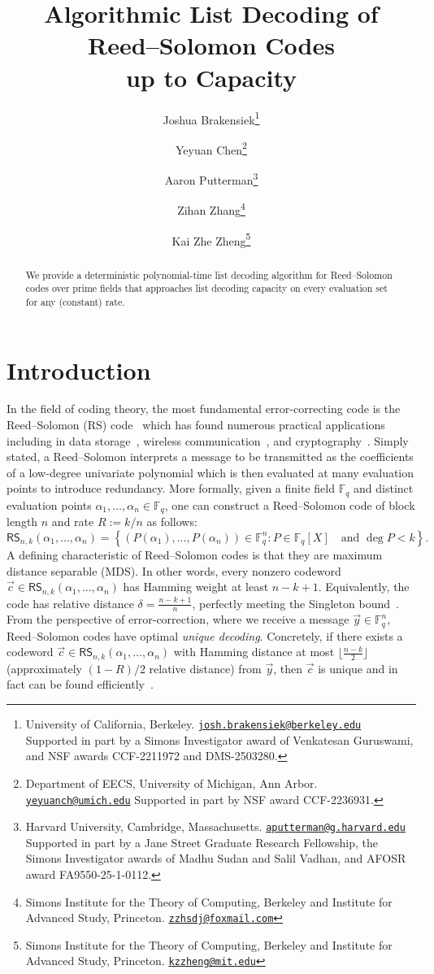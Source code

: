 \documentclass[11pt]{article}
\title{\textbf{Algorithmic List Decoding of Reed--Solomon Codes\\
up to Capacity}}
\author{
Joshua Brakensiek\thanks{
University of California, Berkeley.
\href{mailto:josh.brakensiek@berkeley.edu}{\texttt{josh.brakensiek@berkeley.edu}}
Supported in part by a Simons Investigator award of Venkatesan Guruswami, and NSF awards CCF-2211972 and DMS-2503280.
}
\and
Yeyuan Chen\thanks{
Department of EECS, University of Michigan, Ann Arbor.
\href{mailto:yeyuanch@umich.edu}{\texttt{yeyuanch@umich.edu}}
Supported in part by NSF award CCF-2236931.
}
\and
Aaron Putterman\thanks{
Harvard University, Cambridge, Massachusetts.
\href{mailto:aputterman@g.harvard.edu}{\texttt{aputterman@g.harvard.edu}}
Supported in part by a Jane Street Graduate Research Fellowship, the Simons Investigator awards of Madhu Sudan and Salil Vadhan, and AFOSR award FA9550-25-1-0112.
}
\and
Zihan Zhang\thanks{
Simons Institute for the Theory of Computing, Berkeley and
Institute for Advanced Study, Princeton.
\href{mailto:zzhsdj@foxmail.com}{\texttt{zzhsdj@foxmail.com}}
}
\and
Kai Zhe Zheng\thanks{
Simons Institute for the Theory of Computing, Berkeley and
Institute for Advanced Study, Princeton.
\href{mailto:kzzheng@mit.edu}{\texttt{kzzheng@mit.edu}}
}
}
\date{}
\newcommand{\F}{\mathbb F}
\begin{document}
\maketitle

\begin{abstract}
We provide a deterministic polynomial-time list decoding algorithm for Reed--Solomon codes over prime fields that approaches list decoding capacity on every evaluation set for any (constant) rate. 
\end{abstract}

\section{Introduction}
In the field of coding theory, the most fundamental error-correcting code is the Reed--Solomon (RS) code~\cite{ReedSolomon1960} which has found numerous practical applications including in data storage~\cite{pursley1985performance,plank1997tutorial, plank2009performance, guruswami2016repairing}, wireless communication~\cite{wu1987coding, wicker1992reed, koetter2003algebraic, gross2006applications}, and cryptography~\cite{shamir1979share, mceliece1981sharing, chaum1988multiparty, rabin1989verifiable, pedersen1991threshold, franklin1992communication, juels2006fuzzy, goldberg2007improving, shacham2008compact, ben2019completeness,BBHR18,ACFY24,ACFY25}.
Simply stated, a Reed--Solomon interprets a message to be transmitted as the coefficients of a low-degree univariate polynomial which is then evaluated at many evaluation points to introduce redundancy. More formally, given a finite field $\F_q$ and distinct evaluation points $\alpha_1,\ldots,\alpha_n \in \F_q$, one can construct a Reed--Solomon code of block length $n$ and rate $R:=k/n$ as follows:
\[
\mathsf{RS}_{n, k}(\alpha_1,\ldots,\alpha_n)
=\left\{(P(\alpha_1),\ldots,P(\alpha_n))\in\F_q^n: P\in\F_q[X]\text{ }\text{ and }\deg P<k\right\}.
\]
A defining characteristic of Reed--Solomon codes is that they are maximum distance separable (MDS). In other words, every nonzero codeword $\vec{c} \in \mathsf{RS}_{n,k}(\alpha_1, \hdots, \alpha_n)$ has Hamming weight at least $n-k+1$. Equivalently, the code has relative distance $\delta=\frac{n-k+1}{n}$, perfectly meeting the Singleton bound~\cite{singleton1964maximum}. From the perspective of error-correction, where we receive a message $\vec{y} \in \F_q^n$, Reed--Solomon codes have optimal \emph{unique decoding}. Concretely, if there exists a codeword $\vec{c} \in \mathsf{RS}_{n,k}(\alpha_1, \hdots, \alpha_n)$ with Hamming distance at most $\lfloor \frac{n-k}{2}\rfloor$ (approximately $(1-R)/2$ relative distance) from $\vec{y}$, then $\vec{c}$ is unique and in fact can be found efficiently~\cite{peterson1960encoding,gorenstein1961class,Ber68b,Mas69}.
\end{document}
